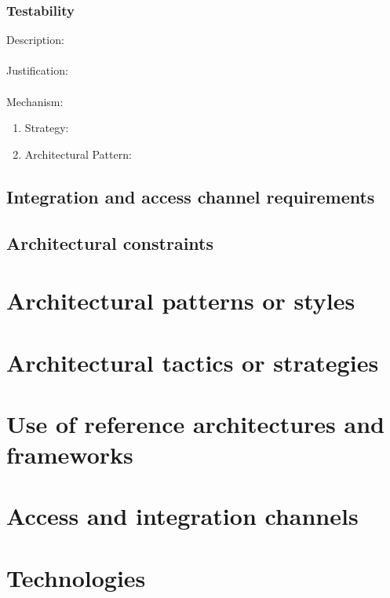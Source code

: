 \documentclass[a4paper,12pt,titlepage]{article}
\begin{document}
\subsubsection{Testability}%
	Description: \\\\
	Justification: \\\\
	Mechanism:
	\begin{enumerate}
		\item Strategy: 
		\item Architectural Pattern:
	\end{enumerate}
\newpage
\subsection{Integration and access channel requirements}
\newpage
\subsection{Architectural constraints}
\newpage
\section{Architectural patterns or styles}
\newpage
\section{Architectural tactics or strategies}
\newpage
\section{Use of reference architectures and frameworks}
\newpage
\section{Access and integration channels}
\newpage
\section{Technologies}
\end{document}
